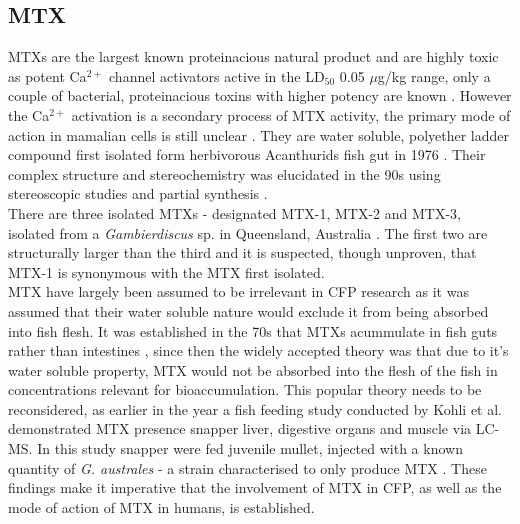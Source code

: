 \subsection{MTX}

MTXs are the largest known proteinacious natural product \cite{yokoyama1988some,murata1993structure} and are highly toxic as potent Ca$^{2+}$ channel activators active in the LD$_{50}$ 0.05 $\mu$g/kg range, only a couple of bacterial, proteinacious toxins with higher potency are known \cite{yokoyama1988some,murata1993structure}. However the Ca$^{2+}$ activation is a secondary process of MTX activity, the primary mode of action in mamalian cells  is still unclear \cite{van2000diversity}. They are water soluble, polyether ladder compound first isolated form herbivorous Acanthurids fish gut in 1976 \cite{yasumoto1976toxicity}. Their complex structure and stereochemistry was elucidated in the 90s using stereoscopic studies and partial synthesis \cite{murata1993structure,murata1994structure,satake1995structural,nonomura1996complete,zheng1996complete}. \\
There are three isolated MTXs - designated MTX-1, MTX-2 and MTX-3, isolated from a \emph{Gambierdiscus} sp. in Queensland, Australia \cite{holmes1994purification}. The first two are structurally larger than the third and it is suspected, though unproven, that MTX-1 is synonymous with the MTX first isolated. \\ %
MTX have largely been assumed to be irrelevant in CFP research as it was assumed that their water soluble nature would exclude it from being absorbed into fish flesh. It was established in the 70s that MTXs acummulate in fish guts rather than intestines \cite{yasumoto1976toxicity}, since then the widely accepted theory was that due to it's water soluble property, MTX would not be absorbed into the flesh of the fish in concentrations relevant for bioaccumulation. This popular theory needs to be reconsidered, as earlier in the year a fish feeding study conducted by Kohli et al. demonstrated MTX presence snapper liver, digestive organs and muscle via LC-MS. In this study snapper were fed juvenile mullet, injected with a known quantity of \emph{G. australes} - a strain characterised to only produce MTX \cite{kohli2014feeding}. These findings make it imperative that the involvement of MTX in CFP, as well as the mode of action of MTX in humans, is established. 



